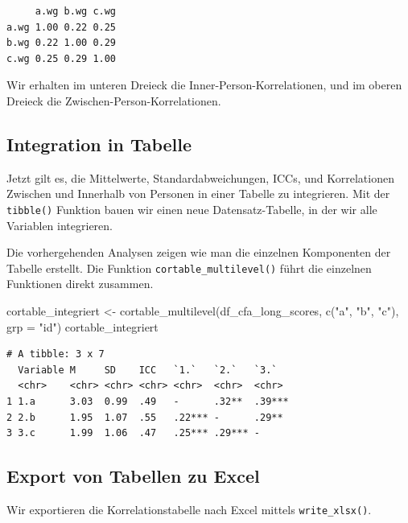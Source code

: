 \documentclass[
  letterpaper,
  DIV=11,
  numbers=noendperiod]{scrreprt}
\newenvironment{Shaded}{\begin{snugshade}}{\end{snugshade}}
\newcommand{\AttributeTok}[1]{\textcolor[rgb]{0.40,0.45,0.13}{#1}}
\newcommand{\FunctionTok}[1]{\textcolor[rgb]{0.28,0.35,0.67}{#1}}
\newcommand{\NormalTok}[1]{\textcolor[rgb]{0.00,0.23,0.31}{#1}}
\newcommand{\OtherTok}[1]{\textcolor[rgb]{0.00,0.23,0.31}{#1}}
\newcommand{\StringTok}[1]{\textcolor[rgb]{0.13,0.47,0.30}{#1}}
\begin{document}
\begin{verbatim}
     a.wg b.wg c.wg
a.wg 1.00 0.22 0.25
b.wg 0.22 1.00 0.29
c.wg 0.25 0.29 1.00
\end{verbatim}

Wir erhalten im unteren Dreieck die Inner-Person-Korrelationen, und im
oberen Dreieck die Zwischen-Person-Korrelationen.

\subsection{Integration in Tabelle}\label{integration-in-tabelle}

Jetzt gilt es, die Mittelwerte, Standardabweichungen, ICCs, und
Korrelationen Zwischen und Innerhalb von Personen in einer Tabelle zu
integrieren. Mit der \texttt{tibble()} Funktion bauen wir einen neue
Datensatz-Tabelle, in der wir alle Variablen integrieren.

Die vorhergehenden Analysen zeigen wie man die einzelnen Komponenten der
Tabelle erstellt. Die Funktion \texttt{cortable\_multilevel()} führt die
einzelnen Funktionen direkt zusammen.

\begin{Shaded}
\begin{Highlighting}[]
\NormalTok{cortable\_integriert }\OtherTok{\textless{}{-}} \FunctionTok{cortable\_multilevel}\NormalTok{(df\_cfa\_long\_scores, }\FunctionTok{c}\NormalTok{(}\StringTok{"a"}\NormalTok{, }\StringTok{"b"}\NormalTok{, }\StringTok{"c"}\NormalTok{), }\AttributeTok{grp =} \StringTok{"id"}\NormalTok{)}
\NormalTok{cortable\_integriert}
\end{Highlighting}
\end{Shaded}

\begin{verbatim}
# A tibble: 3 x 7
  Variable M     SD    ICC   `1.`   `2.`   `3.`  
  <chr>    <chr> <chr> <chr> <chr>  <chr>  <chr> 
1 1.a      3.03  0.99  .49   -      .32**  .39***
2 2.b      1.95  1.07  .55   .22*** -      .29** 
3 3.c      1.99  1.06  .47   .25*** .29*** -     
\end{verbatim}

\subsection{Export von Tabellen zu
Excel}\label{export-von-tabellen-zu-excel}

Wir exportieren die Korrelationstabelle nach Excel mittels
\texttt{write\_xlsx()}.
\end{document}
